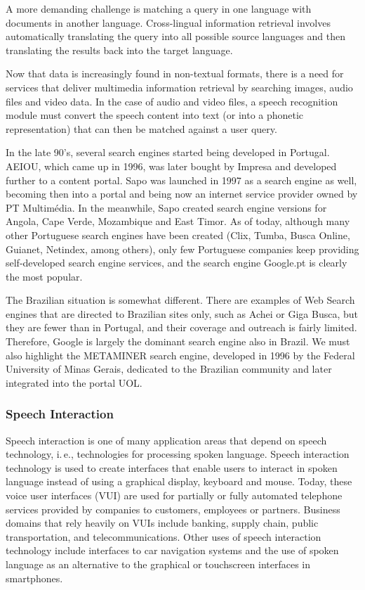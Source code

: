\begin{multicols}{2}
   A more demanding challenge is matching a query in one language with documents in another language. Cross-lingual information retrieval involves automatically translating the query into all possible source languages and then translating the results back into the target language. 

   Now that data is increasingly found in non-textual formats, there is a need for services that deliver multimedia information retrieval by searching images, audio files and video data. In the case of audio and video files, a speech recognition module must convert the speech content into text (or into a phonetic representation) that can then be matched against a user query.

   In the late 90's, several search engines started being developed in Portugal. AEIOU, which came up in 1996, was later bought by Impresa and developed further to a content portal\cite{aeiou}. Sapo was launched in 1997 as a search engine as well, becoming then into a portal and being now an internet service provider owned by PT Multimédia\cite{sapo}. In the meanwhile, Sapo created search engine versions for Angola, Cape Verde, Mozambique and East Timor. As of today, although many other Portuguese search engines have been created (Clix, Tumba, Busca Online, Guianet, Netindex, among others)\cite{colossus}, only few Portuguese companies keep providing self-developed search engine services, and the search engine Google.pt is clearly the most popular.

The Brazilian situation is somewhat different. There are examples of Web Search engines that are directed to Brazilian sites only, such as Achei\cite{achei} or Giga Busca\cite{busca}, but they are fewer than in Portugal, and their coverage and outreach is fairly limited. Therefore, Google is largely the dominant search engine also in Brazil. We must also highlight the METAMINER  search engine, developed in 1996 by the Federal University of Minas Gerais, dedicated to the Brazilian community and later integrated into the portal UOL.

\subsubsection{Speech Interaction}

Speech interaction is one of many application areas that depend on speech technology, i.\,e., technologies for processing spoken language. Speech interaction technology is used to create interfaces that enable users to interact in spoken language instead of using a graphical display, keyboard and mouse.  Today, these voice user interfaces (VUI) are used for partially or fully automated telephone services provided by companies to customers, employees or partners. Business domains that rely heavily on VUIs include banking, supply chain, public transportation, and telecommunications. Other uses of speech interaction technology include interfaces to car navigation systems and the use of spoken language as an alternative to the graphical or touchscreen interfaces in smartphones.


\end{multicols}
